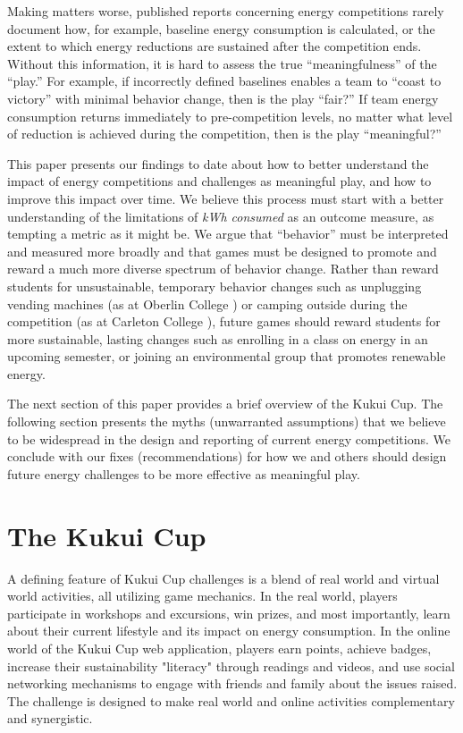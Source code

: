 \documentclass[jou]{apa} %
\begin{document}
Making matters worse, published reports concerning energy competitions rarely document
how, for example, baseline energy consumption is calculated, or the extent to which energy
reductions are sustained after the competition ends.  Without this information, it is
hard to assess the true ``meaningfulness'' of the ``play.''  For example, if incorrectly
defined baselines enables a team to ``coast to victory'' with minimal behavior change,
then is the play ``fair?'' If team energy consumption returns immediately to pre-competition
levels, no matter what level of reduction is achieved during the competition, then is the play ``meaningful?''

This paper presents our findings to date about how to better understand the impact of
energy competitions and challenges as meaningful play, and how to improve this impact over
time.  We believe this process must start with a better understanding of the limitations
of {\em kWh consumed} as an outcome measure, as tempting a metric as it might be.  We
argue that ``behavior'' must be interpreted and measured more broadly and that games must
be designed to promote and reward a much more diverse spectrum of behavior change.  Rather
than reward students for unsustainable, temporary behavior changes such as unplugging
vending machines (as at Oberlin College \cite{Petersen07a}) or camping outside during the
competition (as at Carleton College \cite{Hodge2010}), future games should reward students
for more sustainable, lasting changes such as enrolling in a class on energy in an upcoming
semester, or joining an environmental group that promotes renewable energy.

The next section of this paper provides a brief overview of the Kukui Cup.  The following
section presents the myths (unwarranted assumptions) that we believe to be widespread in the
design and reporting of current energy competitions. We conclude with our fixes (recommendations)
for how we and others should design future energy challenges to be more effective as
meaningful play.

\section{The Kukui Cup}

A defining feature of Kukui Cup challenges is a blend of real world and virtual world
activities, all utilizing game mechanics.  In the real world, players participate in
workshops and excursions, win prizes, and most importantly, learn about their current
lifestyle and its impact on energy consumption.  In the online world of the Kukui Cup web
application, players earn points, achieve badges, increase their sustainability "literacy"
through readings and videos, and use social networking mechanisms to engage with friends
and family about the issues raised. The challenge is designed to make real world and
online activities complementary and synergistic.
\end{document}
